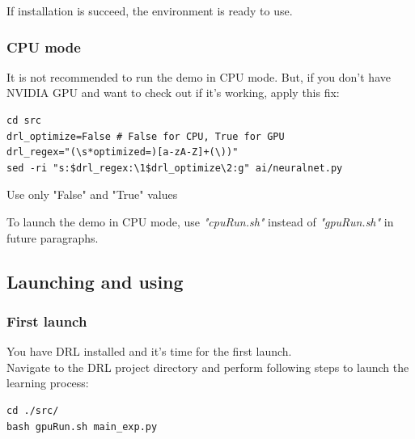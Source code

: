 \documentclass[a4paper,oneside,dvipsnames]{article}
\begin{document}
If installation is succeed, the environment is ready to use.

\subsubsection[CPU mode]{CPU mode}
It is not recommended to run the demo in CPU mode. But, if you don't have NVIDIA GPU and want to check out if it's working, apply this fix:
\begin{verbatim}
cd src
drl_optimize=False # False for CPU, True for GPU
drl_regex="(\s*optimized=)[a-zA-Z]+(\))"
sed -ri "s:$drl_regex:\1$drl_optimize\2:g" ai/neuralnet.py
\end{verbatim}

\begin{tcolorbox}[colbacktitle=red!40!white, coltitle=black, width=\linewidth, fonttitle=\bfseries, title=WARNING]
Use only "False" and "True" values
\end{tcolorbox}

To launch the demo in CPU mode, use \textit{"cpuRun.sh"} instead of \textit{"gpuRun.sh"} in future paragraphs.

\subsection[Launching and using]{Launching and using}
\subsubsection{First launch}
You have DRL installed and it's time for the first launch. \\
Navigate to the DRL project directory and perform following steps to launch the learning process:
\begin{verbatim}
cd ./src/
bash gpuRun.sh main_exp.py
\end{verbatim}
\end{document}
